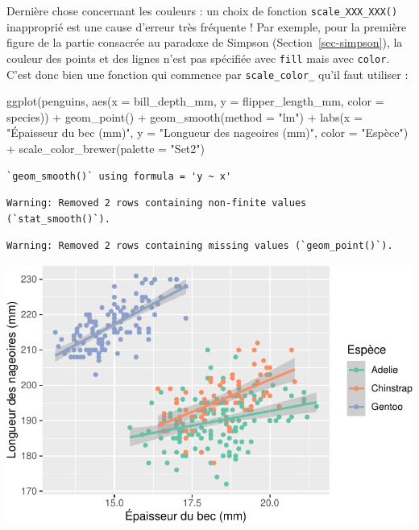 \documentclass[
  a4paper,
  DIV=11,
  numbers=noendperiod,
  oneside]{scrreprt}
\newenvironment{Shaded}{}{}
\newcommand{\AttributeTok}[1]{\textcolor[rgb]{0.84,0.23,0.29}{#1}}
\newcommand{\FunctionTok}[1]{\textcolor[rgb]{0.44,0.26,0.76}{#1}}
\newcommand{\NormalTok}[1]{\textcolor[rgb]{0.14,0.16,0.18}{#1}}
\newcommand{\SpecialCharTok}[1]{\textcolor[rgb]{0.00,0.36,0.77}{#1}}
\newcommand{\StringTok}[1]{\textcolor[rgb]{0.01,0.18,0.38}{#1}}
\begin{document}
Dernière chose concernant les couleurs : un choix de fonction
\texttt{scale\_XXX\_XXX()} inapproprié est une cause d'erreur très
fréquente ! Par exemple, pour la première figure de la partie consacrée
au paradoxe de Simpson (Section~\ref{sec-simpson}), la couleur des
points et des lignes n'est pas spécifiée avec \texttt{fill} mais avec
\texttt{color}. C'est donc bien une fonction qui commence par
\texttt{scale\_color\_} qu'il faut utiliser :

\begin{Shaded}
\begin{Highlighting}[]
\FunctionTok{ggplot}\NormalTok{(penguins, }\FunctionTok{aes}\NormalTok{(}\AttributeTok{x =}\NormalTok{ bill\_depth\_mm, }\AttributeTok{y =}\NormalTok{ flipper\_length\_mm,}
                     \AttributeTok{color =}\NormalTok{ species)) }\SpecialCharTok{+}
  \FunctionTok{geom\_point}\NormalTok{() }\SpecialCharTok{+}
  \FunctionTok{geom\_smooth}\NormalTok{(}\AttributeTok{method =} \StringTok{"lm"}\NormalTok{) }\SpecialCharTok{+}
  \FunctionTok{labs}\NormalTok{(}\AttributeTok{x =} \StringTok{"Épaisseur du bec (mm)"}\NormalTok{, }\AttributeTok{y =} \StringTok{"Longueur des nageoires (mm)"}\NormalTok{,}
       \AttributeTok{color =} \StringTok{"Espèce"}\NormalTok{) }\SpecialCharTok{+}
  \FunctionTok{scale\_color\_brewer}\NormalTok{(}\AttributeTok{palette =} \StringTok{"Set2"}\NormalTok{)}
\end{Highlighting}
\end{Shaded}

\begin{verbatim}
`geom_smooth()` using formula = 'y ~ x'
\end{verbatim}

\begin{verbatim}
Warning: Removed 2 rows containing non-finite values (`stat_smooth()`).
\end{verbatim}

\begin{verbatim}
Warning: Removed 2 rows containing missing values (`geom_point()`).
\end{verbatim}

\includegraphics{03-visualization_files/figure-pdf/unnamed-chunk-102-1.pdf}
\end{document}
